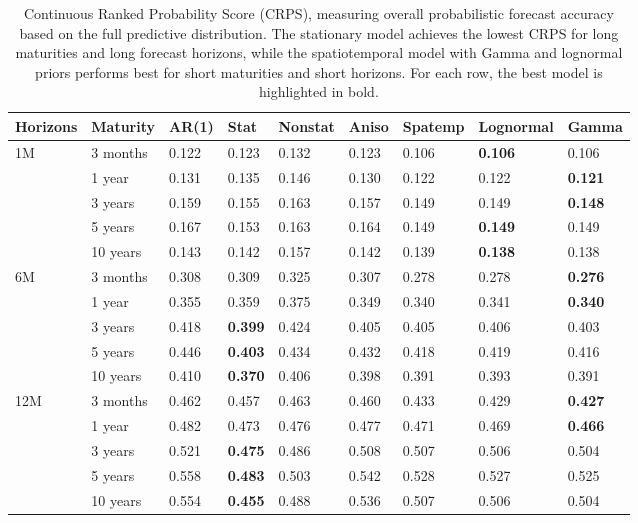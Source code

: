 \documentclass[
  12pt]{article}
\begin{document}
\begin{table}[t!]
    \centering
    \caption{Continuous Ranked Probability Score (CRPS), measuring overall probabilistic forecast accuracy based on the full predictive distribution. The stationary model achieves the lowest CRPS for long maturities and long forecast horizons, while the spatiotemporal model with Gamma and lognormal priors performs best for short maturities and short horizons. For each row, the best model is highlighted in bold.}
    \begin{tabular}{l l l l l l l l l }
    \hline
        Horizons & Maturity & AR(1) & Stat & Nonstat & Aniso & Spatemp & Lognormal & Gamma \\ \hline
        1M & 3 months & 0.122 & 0.123 & 0.132 & 0.123 & 0.106 & \textbf{0.106} & 0.106 \\ 
        ~ & 1 year & 0.131 & 0.135 & 0.146 & 0.130 & 0.122 & 0.122 & \textbf{0.121} \\ 
        ~ & 3 years & 0.159 & 0.155 & 0.163 & 0.157 & 0.149 & 0.149	& \textbf{0.148} \\ 
        ~ & 5 years & 0.167 & 0.153 & 0.163 & 0.164 & 0.149 & \textbf{0.149}	& 0.149 \\ 
        ~ & 10 years & 0.143 & 0.142 & 0.157 & 0.142 & 0.139 & \textbf{0.138} & 0.138 \\ \hline
        6M & 3 months & 0.308 & 0.309 & 0.325 & 0.307 & 0.278 & 0.278 & \textbf{0.276}\\ 
        ~ & 1 year & 0.355 & 0.359 & 0.375 & 0.349 & 0.340 & 0.341 & \textbf{0.340}\\ 
        ~ & 3 years & 0.418 & \textbf{0.399} & 0.424 & 0.405 & 0.405 & 0.406 & 0.403\\ 
        ~ & 5 years & 0.446 & \textbf{0.403} & 0.434 & 0.432 & 0.418 & 0.419	& 0.416\\ 
        ~ & 10 years & 0.410 & \textbf{0.370} & 0.406 & 0.398 & 0.391 & 0.393 & 0.391\\ \hline
        12M & 3 months & 0.462 & 0.457 & 0.463 & 0.460 & 0.433 & 0.429 & \textbf{0.427}\\
        ~ & 1 year & 0.482 & 0.473 & 0.476 & 0.477 & 0.471 & 0.469 & \textbf{0.466}\\ 
        ~ & 3 years & 0.521 & \textbf{0.475} & 0.486 & 0.508 & 0.507 & 0.506 & 0.504\\ 
        ~ & 5 years & 0.558 & \textbf{0.483} & 0.503 & 0.542 & 0.528 & 0.527	& 0.525\\ 
        ~ & 10 years & 0.554 & \textbf{0.455} & 0.488 & 0.536 & 0.507 & 0.506 & 0.504\\ \hline
    \end{tabular}
    \label{crps}
\end{table}
\end{document}
